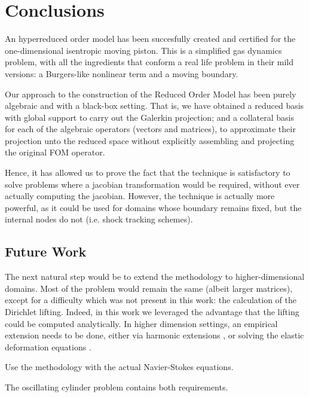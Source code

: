 \documentclass[thesis.tex]{subfiles}
\begin{document}
\section{Conclusions}
An hyperreduced order model has been succesfully created and certified for
the one-dimensional isentropic moving piston.
This is a simplified gas dynamics problem, 
with all the ingredients that conform a real life problem in their mild versions:
a Burgers-like nonlinear term and a moving boundary.

Our approach to the construction of the Reduced Order Model has been
purely algebraic and with a black-box setting.
That is, we have obtained a reduced basis with global support to carry out the Galerkin projection;
and a collateral basis for each of the algebraic operators (vectors and matrices),
to approximate their projection unto the reduced space 
without explicitly assembling and projecting the original FOM operator.

Hence, it has allowed us to prove the fact that the technique is satisfactory
to solve problems where a jacobian transformation would be required,
without ever actually computing the jacobian. 
However, the technique is actually more powerful, 
as it could be used for domains whose boundary remains fixed,
but the internal nodes do not (i.e. shock tracking schemes).


\subsection{Future Work}
The next natural step would be to extend the methodology to higher-dimensional domains.
Most of the problem would remain the same (albeit larger matrices), except for a difficulty 
which was not present in this work: the calculation of the Dirichlet lifting. 
Indeed, in this work we leveraged the advantage that the lifting could be computed analytically.
In higher dimension settings, an empirical extension needs to be done,
either via harmonic extensions
,
or solving the elastic deformation equations
.

Use the methodology with the actual Navier-Stokes equations.

The oscillating cylinder problem contains both requirements.
\end{document}
